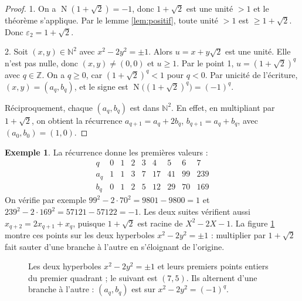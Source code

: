 \documentclass[11pt,a4paper]{article}
\theoremstyle{plain}
\theoremstyle{definition}
\newtheorem{exemple}[theoreme]{Exemple}
\theoremstyle{remark}
\newcommand{\N}{\mathbb{N}}
\newcommand{\Z}{\mathbb{Z}}
\DeclareMathOperator{\Nm}{N}
\begin{document}
\begin{proof}
1. On a $\Nm(1+\sqrt2)=-1$, donc $1+\sqrt2$ est une unité $>1$ et le théorème s'applique. Par le lemme \ref{lem:positif}, toute unité $>1$ est $\geq1+\sqrt2$. Donc $\varepsilon_2=1+\sqrt2$.

2. Soit $(x,y)\in\N^2$ avec $x^2-2y^2=\pm1$. Alors $u=x+y\sqrt2$ est une unité. Elle n'est pas nulle, donc $(x,y)\neq(0,0)$ et $u\geq1$. Par le point 1, $u=(1+\sqrt2)^q$ avec $q\in\Z$. On a $q\geq0$, car $(1+\sqrt2)^q<1$ pour $q<0$. Par unicité de l'écriture, $(x,y)=(a_q,b_q)$, et le signe est $\Nm\big((1+\sqrt2)^q\big)=(-1)^q$.

Réciproquement, chaque $(a_q,b_q)$ est dans $\N^2$. En effet, en multipliant par $1+\sqrt2$, on obtient la récurrence $a_{q+1}=a_q+2b_q$, $b_{q+1}=a_q+b_q$, avec $(a_0,b_0)=(1,0)$.
\end{proof}

\begin{exemple}
La récurrence donne les premières valeurs :
\[
\begin{array}{c|cccccccc}
q&0&1&2&3&4&5&6&7\\\hline
a_q&1&1&3&7&17&41&99&239\\
b_q&0&1&2&5&12&29&70&169
\end{array}
\]
On vérifie par exemple $99^2-2\cdot70^2=9801-9800=1$ et $239^2-2\cdot169^2=57121-57122=-1$. Les deux suites vérifient aussi $x_{q+2}=2x_{q+1}+x_q$, puisque $1+\sqrt2$ est racine de $X^2-2X-1$. La figure \ref{fig:hyperboles} montre ces points sur les deux hyperboles $x^2-2y^2=\pm1$ : multiplier par $1+\sqrt2$ fait sauter d'une branche à l'autre en s'éloignant de l'origine.
\end{exemple}

\begin{figure}[h]
\centering
{}
\caption{Les deux hyperboles $x^2-2y^2=\pm1$ et leurs premiers points entiers du premier quadrant ; le suivant est $(7,5)$. Ils alternent d'une branche à l'autre : $(a_q,b_q)$ est sur $x^2-2y^2=(-1)^q$.}\label{fig:hyperboles}
\end{figure}
\end{document}
